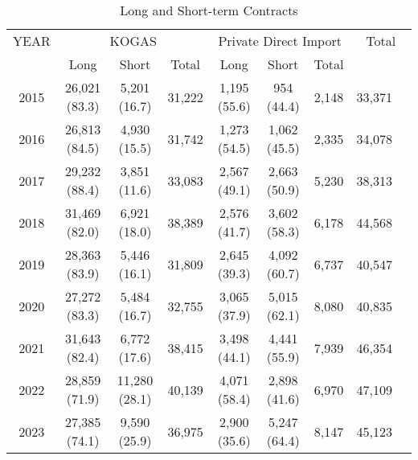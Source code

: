 \documentclass[12pt]{article}
\begin{document}
\begin{table}[h]
\centering
\caption{Long and Short-term Contracts}
\renewcommand{\arraystretch}{0.6}
\begin{tabular}{@{}ccccccccc@{}}
\toprule
YEAR & \multicolumn{3}{c}{KOGAS} & \multicolumn{3}{c}{Private Direct Import} & \multicolumn{2}{c}{Total} \\
\addlinespace
\hline \hline
\addlinespace
 & Long & Short & Total & Long & Short & Total & \\ 
\midrule
2015 & 26,021 (83.3) & 5,201 (16.7) & 31,222 & 1,195 (55.6) & 954 (44.4) & 2,148  & 33,371 \\
2016 & 26,813 (84.5) & 4,930 (15.5) & 31,742 & 1,273 (54.5) & 1,062 (45.5) & 2,335  & 34,078 \\
2017 & 29,232 (88.4) & 3,851 (11.6) & 33,083 & 2,567 (49.1) & 2,663 (50.9) & 5,230  & 38,313 \\
2018 & 31,469 (82.0) & 6,921 (18.0) & 38,389 & 2,576 (41.7) & 3,602 (58.3) & 6,178 & 44,568 \\
2019 & 28,363 (83.9) & 5,446 (16.1) & 31,809 & 2,645 (39.3) & 4,092 (60.7) & 6,737  & 40,547 \\
2020 & 27,272 (83.3) & 5,484 (16.7) & 32,755& 3,065 (37.9) & 5,015 (62.1) & 8,080  & 40,835 \\
2021 & 31,643 (82.4) & 6,772 (17.6) & 38,415 & 3,498 (44.1) & 4,441 (55.9) & 7,939  & 46,354 \\
2022 & 28,859 (71.9) & 11,280 (28.1) & 40,139 & 4,071 (58.4) & 2,898 (41.6) & 6,970  & 47,109 \\
2023 & 27,385 (74.1) & 9,590 (25.9) & 36,975 & 2,900 (35.6) & 5,247 (64.4) & 8,147  & 45,123 \\
\bottomrule
\end{tabular}
\end{table}
\end{document}

